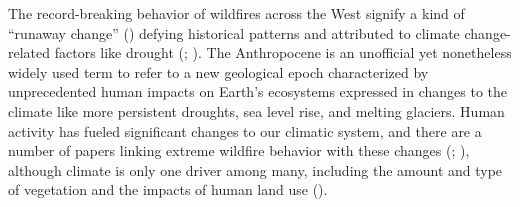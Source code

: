 \documentclass[
]{article}
\begin{document}
The record-breaking behavior of wildfires across the West signify a kind of ``runaway change'' () defying historical patterns and attributed to climate change-related factors like drought (; ). The Anthropocene is an unofficial yet nonetheless widely used term to refer to a new geological epoch characterized by unprecedented human impacts on Earth's ecosystems expressed in changes to the climate like more persistent droughts, sea level rise, and melting glaciers. Human activity has fueled significant changes to our climatic system, and there are a number of papers linking extreme wildfire behavior with these changes (; ), although climate is only one driver among many, including the amount and type of vegetation and the impacts of human land use ().
\end{document}
